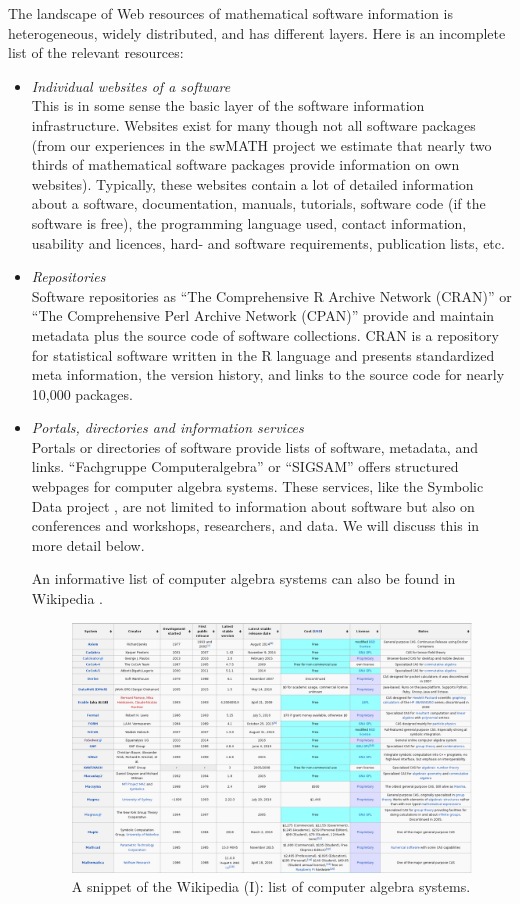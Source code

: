 \documentclass[12pt]{article}
\begin{document}
The landscape of Web resources of mathematical software information is
heterogeneous, widely distributed, and has different layers.  Here is an
incomplete list of the relevant resources:
\begin{itemize}
\item{\textit{Individual websites of a software}}\\ This is in some sense the
  basic layer of the software information infrastructure. Websites exist for
  many though not all software packages (from our experiences in the swMATH
  project we estimate that nearly two thirds of mathematical software packages
  provide information on own websites). Typically, these websites contain a lot
  of detailed information about a software, documentation, manuals, tutorials,
  software code (if the software is free), the programming language used,
  contact information, usability and licences, hard- and software requirements,
  publication lists, etc.
\item{\textit{Repositories}}\\ Software repositories as ``The Comprehensive R
  Archive Network (CRAN)'' \cite{CRAN} or ``The Comprehensive Perl Archive
  Network (CPAN)'' \cite{CPAN} provide and maintain metadata plus the source
  code of software collections. CRAN is a repository for statistical software
  written in the R language and presents standardized meta information, the
  version history, and links to the source code for nearly 10,000 packages.
\item{\textit{Portals, directories and information services}}\\ Portals or
  directories of software provide lists of software, metadata, and
  links. ``Fachgruppe Computeralgebra'' \cite{FAG} or ``SIGSAM'' \cite{SIGSAM}
  offers structured webpages for computer algebra systems. These services, like
  the Symbolic Data project \cite{SD}, are not limited to information about
  software but also on conferences and workshops, researchers, and data. We
  will discuss this in more detail below.

An informative list of computer algebra systems can also be found in Wikipedia
\cite{WikipediaCAS}.

\begin{figure}[h]
  \centering
  \includegraphics[scale=0.22]{aca3}
  \caption{A snippet of the Wikipedia (I): list of computer algebra
    systems.\label{abb_3}}
\end{figure}


\end{itemize}
\end{document}
